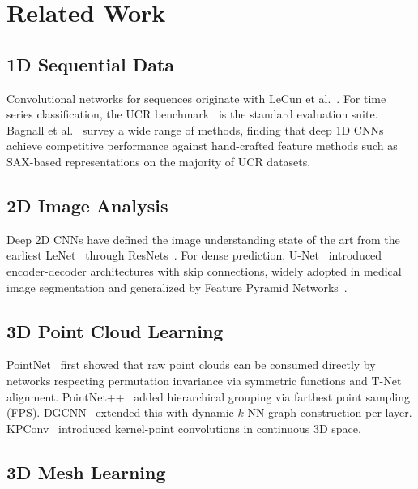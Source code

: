\documentclass[10pt,conference]{IEEEtran}
\begin{document}
\section{Related Work}
\label{sec:related}

\subsection{1D Sequential Data}

Convolutional networks for sequences originate with LeCun et
al.~\cite{lecun1998gradient}. For time series classification, the UCR
benchmark~\cite{dau2019ucr} is the standard evaluation suite. Bagnall et
al.~\cite{bagnall2017great} survey a wide range of methods, finding that
deep 1D CNNs achieve competitive performance against hand-crafted feature
methods such as SAX-based representations on the majority of UCR datasets.

\subsection{2D Image Analysis}

Deep 2D CNNs have defined the image understanding state of the art from the
earliest LeNet~\cite{lecun1998gradient} through
ResNets~\cite{he2016deep}. For dense prediction, U-Net~\cite{ronneberger2015unet}
introduced encoder-decoder architectures with skip connections, widely
adopted in medical image segmentation and generalized by Feature Pyramid
Networks~\cite{lin2017fpn}.

\subsection{3D Point Cloud Learning}

PointNet~\cite{qi2017pointnet} first showed that raw point clouds can be
consumed directly by networks respecting permutation invariance via
symmetric functions and T-Net alignment. PointNet++~\cite{qi2017pointnetplusplus}
added hierarchical grouping via farthest point sampling (FPS). DGCNN~\cite{wang2019dgcnn}
extended this with dynamic $k$-NN graph construction per layer. KPConv~\cite{thomas2019kpconv}
introduced kernel-point convolutions in continuous 3D space.

\subsection{3D Mesh Learning}
\end{document}
